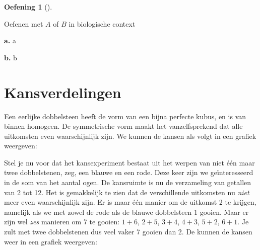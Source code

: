 \documentclass[
  a4paper,
]{scrbook}
\theoremstyle{definition}
\newtheorem{exercise}{Oefening}[chapter]
\theoremstyle{definition}
\theoremstyle{remark}
\begin{document}
\begin{exercise}[]\protect\hypertarget{exr-or-context}{}\label{exr-or-context}

Oefenen met \(A\) of \(B\) in biologische context

\textbf{a.} a

\textbf{b.} b

\end{exercise}

\section{Kansverdelingen}\label{kansverdelingen}

Een eerlijke dobbelsteen heeft de vorm van een bijna perfecte kubus, en
is van binnen homogeen. De symmetrische vorm maakt het vanzelfsprekend
dat alle uitkomsten even waarschijnlijk zijn. We kunnen de kansen als
volgt in een grafiek weergeven:

\begin{figure}


\caption{\label{fig-uniform-die}}

\end{figure}%

Stel je nu voor dat het kansexperiment bestaat uit het werpen van niet
één maar twee dobbelstenen, zeg, een blauwe en een rode. Deze keer zijn
we geïnteresseerd in de som van het aantal ogen. De kansruimte is nu de
verzameling van getallen van 2 tot 12. Het is gemakkelijk te zien dat de
verschillende uitkomsten nu \emph{niet} meer even waarschijnlijk zijn.
Er is maar één manier om de uitkomst 2 te krijgen, namelijk als we met
zowel de rode als de blauwe dobbelsteen 1 gooien. Maar er zijn wel
\emph{zes} manieren om 7 te gooien: \(1 + 6\), \(2 + 5\), \(3 + 4\),
\(4 + 3\), \(5 + 2\), \(6 + 1\). Je zult met twee dobbelstenen dus veel
vaker 7 gooien dan 2. De kunnen de kansen weer in een grafiek weergeven:

\begin{figure}


\caption{\label{fig-kansverdeling-twee-dobbelstenen}}

\end{figure}%
\end{document}
